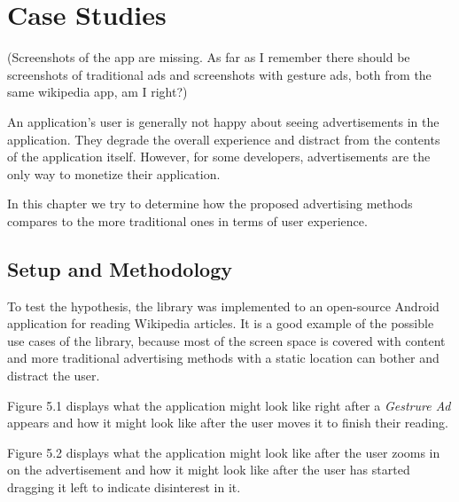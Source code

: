 \chapter{Case Studies}

(Screenshots of the app are missing. As far as I remember there should be screenshots of traditional ads and screenshots with gesture ads, both from the same wikipedia app, am I right?)

An application's user is generally not happy about seeing advertisements in the application. They degrade the overall experience and distract from the contents of the application itself. However, for some developers, advertisements are the only way to monetize their application.

In this chapter we try to determine how the proposed advertising methods compares to the more traditional ones in terms of user experience.

\section{Setup and Methodology}

To test the hypothesis, the library was implemented to an open-source Android application for reading Wikipedia articles. It is a good example of the possible use cases of the library, because most of the screen space is covered with content and more traditional advertising methods with a static location can bother and distract the user.

Figure 5.1 displays what the application might look like right after a \textit{Gestrure Ad} appears and how it might look like after the user moves it to finish their reading.

Figure 5.2 displays what the application might look like after the user zooms in on the advertisement and how it might look like after the user has started dragging it left to indicate disinterest in it.

